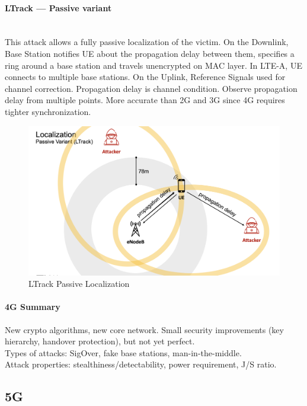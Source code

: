 \paragraph{LTrack --- Passive variant} \mbox{} \\
This attack allows a fully passive localization of the victim.
On the Downlink, Base Station notifies UE about the propagation delay between them, specifies a ring around a base station and travels unencrypted on MAC layer.
In LTE-A, UE connects to multiple base stations.
On the Uplink, Reference Signals used for channel correction. Propagation delay is channel condition. Observe propagation delay from multiple points. More accurate than 2G and 3G since 4G requires tighter synchronization.
\begin{figure}[h]
	\centering
	\includegraphics[scale=0.135]{images/10-ltrack.png}
	\caption{LTrack Passive Localization}%
	\label{fig:ltrack}
\end{figure}

\paragraph{4G Summary}
New crypto algorithms, new core network. Small security improvements (key
hierarchy, handover protection), but not yet perfect. \\ Types of attacks:
SigOver, fake base stations, man-in-the-middle. \\ Attack properties:
stealthiness/detectability, power requirement, J/S ratio.

\subsection{5G}

